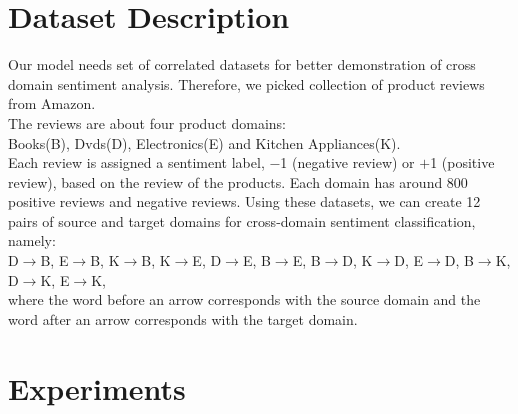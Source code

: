 \documentclass{report}
\begin{document}

\chapter{Dataset Description}
Our model needs set of correlated datasets for better demonstration of cross domain sentiment analysis.
Therefore, we picked collection of product reviews from Amazon.\\
\linebreak
The reviews are about four product domains:\\
Books(B), Dvds(D), Electronics(E) and Kitchen Appliances(K).\\
\linebreak
Each review is assigned a sentiment label, $-$1 (negative review) or $+$1 (positive review), based on the
review of the products. Each domain has around 800 positive reviews and negative reviews.
Using these datasets, we can create 12 pairs of source and target domains for cross-domain sentiment classification, namely:\\
\linebreak
D\(\rightarrow\)B, E\(\rightarrow\)B,  K\(\rightarrow\)B,  K\(\rightarrow\)E,  D\(\rightarrow\)E,  B\(\rightarrow\)E,  B\(\rightarrow\)D,  K\(\rightarrow\)D,  E\(\rightarrow\)D,  B\(\rightarrow\)K,  D\(\rightarrow\)K,  E\(\rightarrow\)K,\\
\linebreak 
where the word before an arrow corresponds with the source domain and the word after an arrow corresponds with the target domain.\\


\chapter{Experiments}
\end{document}
